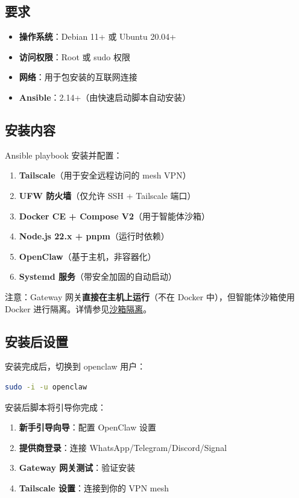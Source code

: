 \subsection{要求}


\begin{itemize}
  \item \textbf{操作系统}：Debian 11+ 或 Ubuntu 20.04+
  \item \textbf{访问权限}：Root 或 sudo 权限
  \item \textbf{网络}：用于包安装的互联网连接
  \item \textbf{Ansible}：2.14+（由快速启动脚本自动安装）
\end{itemize}


\subsection{安装内容}


Ansible playbook 安装并配置：

\begin{enumerate}
  \item \textbf{Tailscale}（用于安全远程访问的 mesh VPN）
  \item \textbf{UFW 防火墙}（仅允许 SSH + Tailscale 端口）
  \item \textbf{Docker CE + Compose V2}（用于智能体沙箱）
  \item \textbf{Node.js 22.x + pnpm}（运行时依赖）
  \item \textbf{OpenClaw}（基于主机，非容器化）
  \item \textbf{Systemd 服务}（带安全加固的自动启动）
\end{enumerate}


注意：Gateway 网关\textbf{直接在主机上运行}（不在 Docker 中），但智能体沙箱使用 Docker 进行隔离。详情参见\href{/gateway/sandboxing}{沙箱隔离}。

\subsection{安装后设置}


安装完成后，切换到 openclaw 用户：

\begin{lstlisting}[language=bash]
sudo -i -u openclaw
\end{lstlisting}


安装后脚本将引导你完成：

\begin{enumerate}
  \item \textbf{新手引导向导}：配置 OpenClaw 设置
  \item \textbf{提供商登录}：连接 WhatsApp/Telegram/Discord/Signal
  \item \textbf{Gateway 网关测试}：验证安装
  \item \textbf{Tailscale 设置}：连接到你的 VPN mesh
\end{enumerate}


